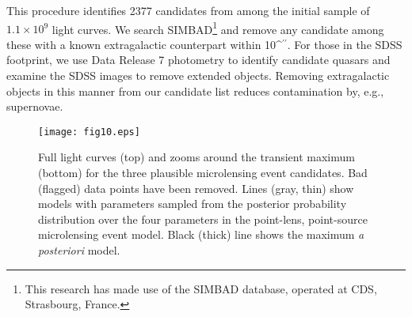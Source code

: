 \documentclass{emulateapj}
\def\asec{\ifmmode^{\prime\prime}\else$^{\prime\prime}$\fi}
\begin{document}
This procedure identifies 2377 candidates from among the initial sample of $1.1\times10^9$ light curves. We search SIMBAD\footnote{This research has made use of the SIMBAD database, operated at CDS, Strasbourg, France.} and remove any candidate among these with a known extragalactic counterpart within 10\asec. For those in the SDSS footprint, we use Data Release 7 photometry \citep{DR7paper} to identify candidate quasars \citep[using the cuts described in][]{richards02} and examine the SDSS images \citep{sdss_images} to remove extended objects. Removing extragalactic objects in this manner from our candidate list reduces contamination by, e.g., supernovae. 

\begin{figure*}[htb]
\centering
\texttt{[image: fig10.eps]}
\caption{Full light curves (top) and zooms around the transient maximum (bottom) for the three plausible microlensing event candidates. Bad (flagged) data points have been removed. Lines (gray, thin) show models with parameters sampled from the posterior probability distribution over the four parameters in the point-lens, point-source microlensing event model. Black (thick) line shows the maximum {\it a posteriori} model. }\label{fig:candidates}
\end{figure*}
\end{document}
